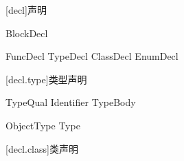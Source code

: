
[decl]{声明}

\begin{bnf}
 \br
    BlockDecl \br
\end{bnf}

\begin{bnf}
 \br
    FuncDecl \br
    TypeDecl \br
    ClassDecl \br
    EnumDecl \br
\end{bnf}

[decl.type]{类型声明}

\begin{bnf}
 \br
    TypeQual\bnfs {} Identifier TypeBody
\end{bnf}

\begin{bnf}
 \br

\end{bnf}

\begin{bnf}
 \br
    ObjectType
    \terminal{=} Type
\end{bnf}

[decl.class]{类声明}
